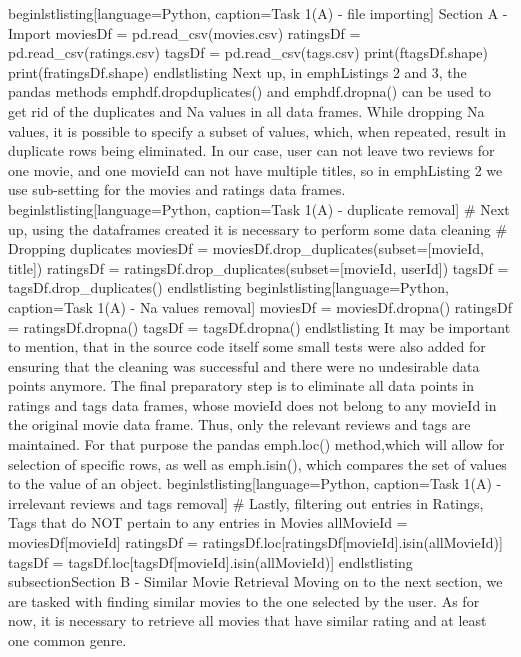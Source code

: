begin{lstlisting}[language=Python, caption=Task 1(A) - file importing]
         Section A - Import
        moviesDf = pd.read_csv(movies.csv)
        ratingsDf = pd.read_csv(ratings.csv)
        tagsDf = pd.read_csv(tags.csv)
        print(f{tagsDf.shape})
        print(f{ratingsDf.shape})
end{lstlisting}
Next up, in emph{Listings 2 and 3},  the pandas methods emph{df.dropduplicates()} and emph{df.dropna()} can be used to get rid of the duplicates and Na values in all data frames. While dropping Na values,
it is possible to  specify a subset of values, which, when repeated, result in duplicate rows being eliminated. In our case, user  can not leave two reviews for one movie, and one movieId can not have 
multiple titles, so in emph{Listing 2} we use sub-setting for the movies and ratings data frames.
begin{lstlisting}[language=Python, caption=Task 1(A) - duplicate removal]
        # Next up, using the dataframes created it is necessary to perform some  data cleaning
        # Dropping duplicates
        moviesDf = moviesDf.drop_duplicates(subset=[movieId, title])
        ratingsDf = ratingsDf.drop_duplicates(subset=[movieId, userId])
        tagsDf = tagsDf.drop_duplicates()
end{lstlisting}
begin{lstlisting}[language=Python, caption=Task 1(A) - Na values removal]
        moviesDf = moviesDf.dropna()
        ratingsDf = ratingsDf.dropna()
        tagsDf = tagsDf.dropna()
end{lstlisting}
It may be important to mention, that in the source code itself some small tests were also added for ensuring that the cleaning was  successful and there were no undesirable data points anymore.
The final preparatory step is to eliminate all data points in ratings and tags data frames, whose movieId
does not  belong to any movieId in the original movie data frame. Thus, only the relevant reviews and tags
are maintained.  For that  purpose the pandas emph{.loc()} method,which will allow for selection of specific rows, as well as emph{.isin()}, which compares the set of values to the value  of an object.
begin{lstlisting}[language=Python, caption=Task 1(A) - irrelevant  reviews and tags removal]
# Lastly, filtering out entries in Ratings, Tags  that  do NOT pertain to any entries in Movies
        allMovieId = moviesDf[movieId]
        ratingsDf = ratingsDf.loc[ratingsDf[movieId].isin(allMovieId)]
        tagsDf = tagsDf.loc[tagsDf[movieId].isin(allMovieId)]
end{lstlisting}
subsection{Section B - Similar  Movie Retrieval}
Moving on to the next section, we are tasked with finding similar movies to the one selected by the
user. As for now, it is necessary to retrieve all movies that have similar rating and at least one common genre.
